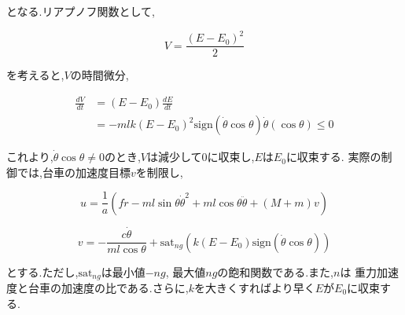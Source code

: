 となる.リアプノフ関数として,

\begin{equation}
    V = \frac{(E - E_{0})^2}{2}
\end{equation}

を考えると,$V$の時間微分,

\begin{equation}
    \begin{split}
        \frac{dV}{dt} &= (E - E_{0}) \frac{dE}{dt} \\
                      &= -mlk(E - E_{0})^2 \mbox{sign} (\dot{\theta} \cos{\theta}) \dot{\theta} (\cos{\theta}) \leq 0
    \end{split}
\end{equation}

これより,$\dot{\theta} \cos{\theta} \neq 0$のとき,$V$は減少して$0$に収束し,$E$は$E_{0}$に収束する.
実際の制御では,台車の加速度目標$v$を制限し,

$$
    u = \frac{1}{a}
        \left(
            f \dot{r} - ml \sin{\theta} \dot{\theta}^2 + ml \cos{\theta} \ddot{\theta}
            + (M + m)v
        \right)
$$

$$
    v = - \frac{c \dot{\theta}}{ml\cos{\theta}} 
        + \mbox{sat}_{ng} (k(E - E_{0}) \mbox{sign}(\dot{\theta}\cos{\theta}))
$$

とする.ただし,$\mbox{sat}_{ng}$は最小値$-ng$, 最大値$ng$の飽和関数である.また,$n$は
重力加速度と台車の加速度の比である.さらに,$k$を大きくすればより早く$E$が$E_{0}$に収束する.



